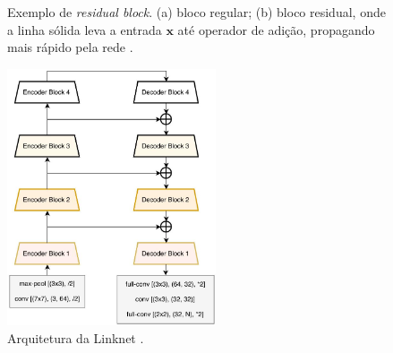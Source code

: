 \documentclass[12pt, a4paper, english, brazil]{article}
\begin{document}
\begin{figure}[htbp]
    \centering
    \caption{Exemplo de \textit{residual block}. (a) bloco regular; (b) bloco residual, onde a linha sólida leva a entrada $\textbf{x}$ até operador de adição, propagando mais rápido pela rede \cite{Zhang_2021}.}
    \label{fig:residual_block}
\end{figure}

\begin{figure}[htbp]
    \centering
    \includegraphics[width=0.55\textwidth]{img/linknet.jpg}
    \caption{Arquitetura da Linknet \cite{Chaurasia_2017}.}
    \label{fig:linknet}
\end{figure}
\end{document}
